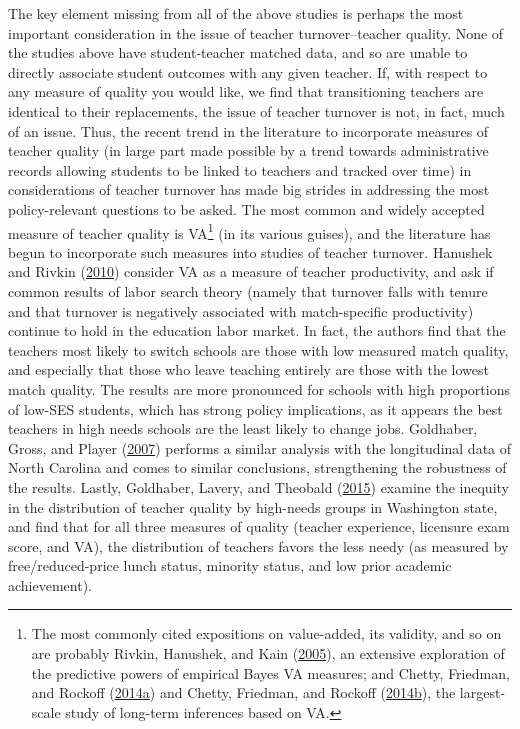 \documentclass[12pt,]{article}
\let\rmarkdownfootnote\footnote%
\def\footnote{\protect\rmarkdownfootnote}
\begin{document}
The key element missing from all of the above studies is perhaps the
most important consideration in the issue of teacher turnover--teacher
quality. None of the studies above have student-teacher matched data,
and so are unable to directly associate student outcomes with any given
teacher. If, with respect to any measure of quality you would like, we
find that transitioning teachers are identical to their replacements,
the issue of teacher turnover is not, in fact, much of an issue. Thus,
the recent trend in the literature to incorporate measures of teacher
quality (in large part made possible by a trend towards administrative
records allowing students to be linked to teachers and tracked over
time) in considerations of teacher turnover has made big strides in
addressing the most policy-relevant questions to be asked. The most
common and widely accepted measure of teacher quality is VA\footnote{The
  most commonly cited expositions on value-added, its validity, and so
  on are probably Rivkin, Hanushek, and Kain
  (\protect\hyperlink{ref-rivkin}{2005}), an extensive exploration of
  the predictive powers of empirical Bayes VA measures; and Chetty,
  Friedman, and Rockoff
  (\protect\hyperlink{ref-chettyI}{2014}\protect\hyperlink{ref-chettyI}{a})
  and Chetty, Friedman, and Rockoff
  (\protect\hyperlink{ref-chettyII}{2014}\protect\hyperlink{ref-chettyII}{b}),
  the largest-scale study of long-term inferences based on VA.} (in its
various guises), and the literature has begun to incorporate such
measures into studies of teacher turnover. Hanushek and Rivkin
(\protect\hyperlink{ref-hanushek2010}{2010}) consider VA as a measure of
teacher productivity, and ask if common results of labor search theory
(namely that turnover falls with tenure and that turnover is negatively
associated with match-specific productivity) continue to hold in the
education labor market. In fact, the authors find that the teachers most
likely to switch schools are those with low measured match quality, and
especially that those who leave teaching entirely are those with the
lowest match quality. The results are more pronounced for schools with
high proportions of low-SES students, which has strong policy
implications, as it appears the best teachers in high needs schools are
the least likely to change jobs. Goldhaber, Gross, and Player
(\protect\hyperlink{ref-goldhaber2007}{2007}) performs a similar
analysis with the longitudinal data of North Carolina and comes to
similar conclusions, strengthening the robustness of the results.
Lastly, Goldhaber, Lavery, and Theobald
(\protect\hyperlink{ref-goldhaber2015}{2015}) examine the inequity in
the distribution of teacher quality by high-needs groups in Washington
state, and find that for all three measures of quality (teacher
experience, licensure exam score, and VA), the distribution of teachers
favors the less needy (as measured by free/reduced-price lunch status,
minority status, and low prior academic achievement).
\end{document}
